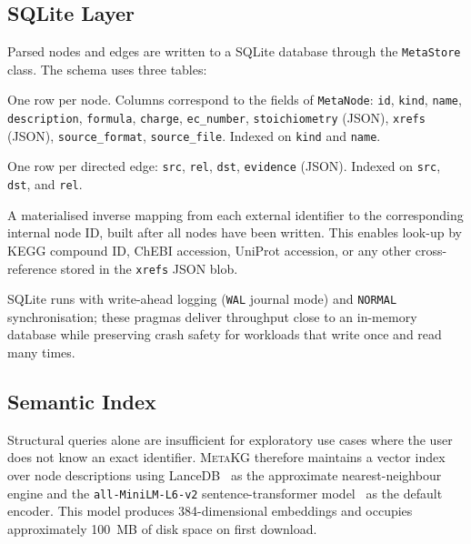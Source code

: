 \documentclass[10pt]{article}
\begin{document}
\subsection{SQLite Layer}

Parsed nodes and edges are written to a SQLite database through the
\texttt{MetaStore} class. The schema uses three tables:

\begin{description}[leftmargin=*,itemsep=2pt]
  \item[\texttt{meta\_nodes}] One row per node. Columns correspond to the
    fields of \texttt{MetaNode}: \texttt{id}, \texttt{kind}, \texttt{name},
    \texttt{description}, \texttt{formula}, \texttt{charge},
    \texttt{ec\_number}, \texttt{stoichiometry} (JSON), \texttt{xrefs}
    (JSON), \texttt{source\_format}, \texttt{source\_file}. Indexed on
    \texttt{kind} and \texttt{name}.
  \item[\texttt{meta\_edges}] One row per directed edge: \texttt{src},
    \texttt{rel}, \texttt{dst}, \texttt{evidence} (JSON). Indexed on
    \texttt{src}, \texttt{dst}, and \texttt{rel}.
  \item[\texttt{xref\_index}] A materialised inverse mapping from each
    external identifier to the corresponding internal node ID, built after
    all nodes have been written. This enables look-up by KEGG compound ID,
    ChEBI accession, UniProt accession, or any other cross-reference stored
    in the \texttt{xrefs} JSON blob.
\end{description}

SQLite runs with write-ahead logging (\texttt{WAL} journal mode) and
\texttt{NORMAL} synchronisation; these pragmas deliver throughput close to an
in-memory database while preserving crash safety for workloads that write once
and read many times.

\subsection{Semantic Index}

Structural queries alone are insufficient for exploratory use cases where the
user does not know an exact identifier. \textsc{MetaKG} therefore maintains a
vector index over node descriptions using LanceDB~\citep{lancedb2023} as the
approximate nearest-neighbour engine and the \texttt{all-MiniLM-L6-v2}
sentence-transformer model~\citep{reimers2019sbert} as the default encoder.
This model produces 384-dimensional embeddings and occupies approximately
100~MB of disk space on first download.
\end{document}
